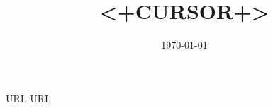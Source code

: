 \documentclass[11pt,a4paper]{jsarticle}
\title{<+CURSOR+>}
\author{}
\date{\today}
\begin{document}
\maketitle

\section{}

\begin{thebibliography}{9}
   URL
   URL
\end{thebibliography}
\end{document}
